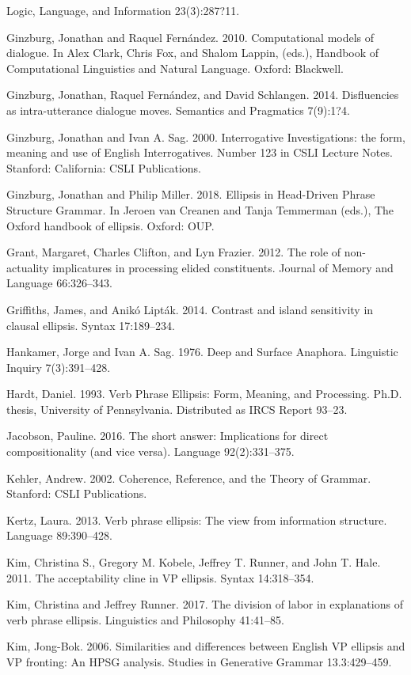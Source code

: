 \documentclass[output=paper
                ,modfonts
                ,nonflat
	        ,collection
	        ,collectionchapter
	        ,collectiontoclongg
 	        ,biblatex
                ,babelshorthands
                ,newtxmath
                ,draftmode
                ,colorlinks, citecolor=brown
]{./langsci/langscibook}
\begin{document}
\begin{description}
Logic, Language, and Information 23(3):287?11.
\item Ginzburg, Jonathan and Raquel Fern\'{a}ndez. 2010. Computational models of dialogue. In Alex
Clark, Chris Fox, and Shalom Lappin, (eds.), Handbook of Computational Linguistics and
Natural Language. Oxford: Blackwell.
\item Ginzburg, Jonathan, Raquel Fern\'{a}ndez, and David Schlangen. 2014. Disfluencies as
intra-utterance dialogue moves. Semantics and Pragmatics 7(9):1?4.
\item Ginzburg, Jonathan and Ivan A. Sag. 2000. Interrogative Investigations: the form, meaning
and use of English Interrogatives. Number 123 in CSLI Lecture Notes. Stanford:
California: CSLI Publications.
\item Ginzburg, Jonathan and Philip Miller. 2018. Ellipsis in Head-Driven Phrase Structure Grammar. In Jeroen van Creanen and Tanja Temmerman (eds.), The Oxford handbook of ellipsis. Oxford: OUP.
\item Grant, Margaret, Charles Clifton, and Lyn Frazier. 2012. The role of non-actuality
implicatures in processing elided constituents. Journal of Memory and Language
66:326--343.
\item Griffiths, James, and Anik\'{o} Lipt\'{a}k. 2014. Contrast and island sensitivity in clausal ellipsis. Syntax 17:189--234.
\item Hankamer, Jorge and Ivan A. Sag. 1976. Deep and Surface Anaphora. Linguistic
Inquiry 7(3):391--428.
\item Hardt, Daniel. 1993. Verb Phrase Ellipsis: Form, Meaning, and Processing. Ph.D. thesis,
University of Pennsylvania. Distributed as IRCS Report 93--23.
\item Jacobson, Pauline. 2016. The short answer: Implications for direct compositionality (and vice
versa). Language 92(2):331--375.
\item Kehler, Andrew. 2002. Coherence, Reference, and the Theory of Grammar. Stanford: CSLI
Publications.
\item Kertz, Laura. 2013. Verb phrase ellipsis: The view from information structure. Language
89:390--428.
\item Kim, Christina S., Gregory M. Kobele, Jeffrey T. Runner, and John T. Hale. 2011. The
acceptability cline in VP ellipsis. Syntax 14:318--354.
\item Kim, Christina and Jeffrey Runner. 2017. The division of labor in explanations of verb phrase ellipsis. Linguistics and Philosophy 41:41--85.
\item Kim, Jong-Bok. 2006. Similarities and differences between English VP ellipsis and VP fronting: An HPSG analysis. Studies in Generative Grammar 13.3:429--459.

\end{description}
\end{document}
